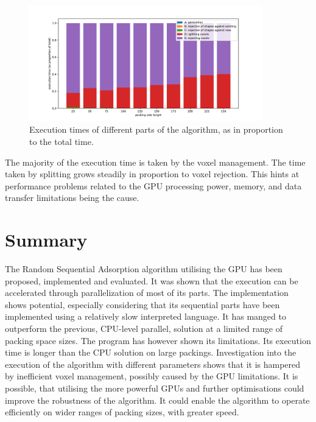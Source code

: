 \documentclass[12pt, oneside]{report}
\begin{document}
\begin{figure}[H]
  \centering
	\includegraphics[width=0.9\textwidth,keepaspectratio]{Images/SummaryComparison/parts_proportional.pdf}
	\caption{Execution times of different parts of the algorithm, as in proportion to the total time.}
	\label{summary_times_proportional}
\end{figure}

The majority of the execution time is taken by the voxel management. The time taken by splitting grows steadily in proportion to voxel rejection. This hints at performance problems related to the GPU processing power, memory, and data transfer limitations being the cause.


\section{Summary}

The Random Sequential Adsorption algorithm utilising the GPU has been proposed, implemented and evaluated. It was shown that the execution can be accelerated through parallelization of most of its parts. The implementation shows potential, especially considering that its sequential parts have been implemented using a relatively slow interpreted language. It has manged to outperform the previous, CPU-level parallel, solution at a limited range of packing space sizes. \newline
The program has however shown its limitations. Its execution time is longer than the CPU solution on large packings. Investigation into the execution of the algorithm with different parameters shows that it is hampered by inefficient voxel management, possibly caused by the GPU limitations. It is possible, that utilising the more powerful GPUs and further optimisations could improve the robustness of the algorithm. It could enable the algorithm to operate efficiently on wider ranges of packing sizes, with greater speed.


\newpage
\printbibliography
\end{document}
